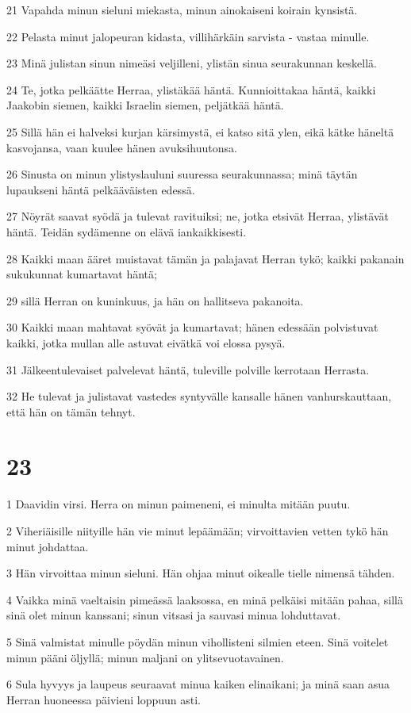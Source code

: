 \par 21 Vapahda minun sieluni miekasta, minun ainokaiseni koirain kynsistä.
\par 22 Pelasta minut jalopeuran kidasta, villihärkäin sarvista - vastaa minulle.
\par 23 Minä julistan sinun nimeäsi veljilleni, ylistän sinua seurakunnan keskellä.
\par 24 Te, jotka pelkäätte Herraa, ylistäkää häntä. Kunnioittakaa häntä, kaikki Jaakobin siemen, kaikki Israelin siemen, peljätkää häntä.
\par 25 Sillä hän ei halveksi kurjan kärsimystä, ei katso sitä ylen, eikä kätke häneltä kasvojansa, vaan kuulee hänen avuksihuutonsa.
\par 26 Sinusta on minun ylistyslauluni suuressa seurakunnassa; minä täytän lupaukseni häntä pelkääväisten edessä.
\par 27 Nöyrät saavat syödä ja tulevat ravituiksi; ne, jotka etsivät Herraa, ylistävät häntä. Teidän sydämenne on elävä iankaikkisesti.
\par 28 Kaikki maan ääret muistavat tämän ja palajavat Herran tykö; kaikki pakanain sukukunnat kumartavat häntä;
\par 29 sillä Herran on kuninkuus, ja hän on hallitseva pakanoita.
\par 30 Kaikki maan mahtavat syövät ja kumartavat; hänen edessään polvistuvat kaikki, jotka mullan alle astuvat eivätkä voi elossa pysyä.
\par 31 Jälkeentulevaiset palvelevat häntä, tuleville polville kerrotaan Herrasta.
\par 32 He tulevat ja julistavat vastedes syntyvälle kansalle hänen vanhurskauttaan, että hän on tämän tehnyt.

\chapter{23}

\par 1 Daavidin virsi. Herra on minun paimeneni, ei minulta mitään puutu.
\par 2 Viheriäisille niityille hän vie minut lepäämään; virvoittavien vetten tykö hän minut johdattaa.
\par 3 Hän virvoittaa minun sieluni. Hän ohjaa minut oikealle tielle nimensä tähden.
\par 4 Vaikka minä vaeltaisin pimeässä laaksossa, en minä pelkäisi mitään pahaa, sillä sinä olet minun kanssani; sinun vitsasi ja sauvasi minua lohduttavat.
\par 5 Sinä valmistat minulle pöydän minun vihollisteni silmien eteen. Sinä voitelet minun pääni öljyllä; minun maljani on ylitsevuotavainen.
\par 6 Sula hyvyys ja laupeus seuraavat minua kaiken elinaikani; ja minä saan asua Herran huoneessa päivieni loppuun asti.

